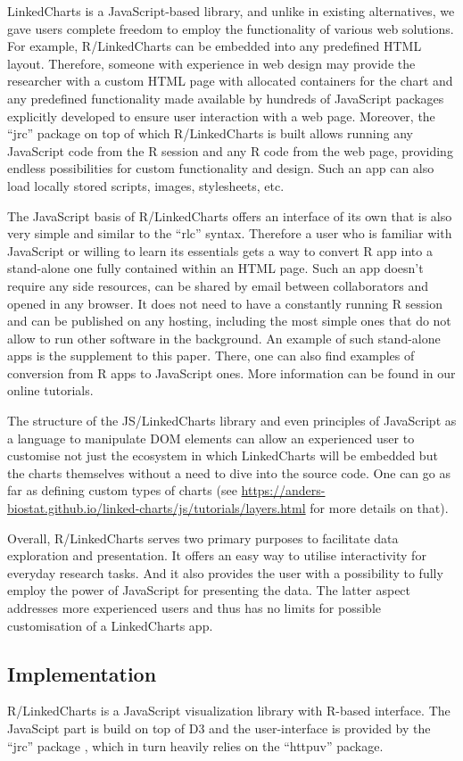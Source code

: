 \documentclass[twocolumn,10pt]{article}
\begin{document}
LinkedCharts is a JavaScript-based library, and unlike in existing alternatives, we gave users complete freedom to employ the functionality of various web solutions. For example, R/LinkedCharts can be embedded into any predefined HTML layout. Therefore, someone with experience in web design may provide the researcher with a custom HTML page with allocated containers for the chart and any predefined functionality made available by hundreds of JavaScript packages explicitly developed to ensure user interaction with a web page. Moreover, the ``jrc'' package on top of which R/LinkedCharts is built allows running any JavaScript code from the R session and any R code from the web page, providing endless possibilities for custom functionality and design. Such an app can also load locally stored scripts, images, stylesheets, etc.

The JavaScript basis of R/LinkedCharts offers an interface of its own that is also very simple and similar to the ``rlc'' syntax. Therefore a user who is familiar with JavaScript or willing to learn its essentials gets a way to convert R app into a stand-alone one fully contained within an HTML page. Such an app doesn't require any side resources, can be shared by email between collaborators and opened in any browser. It does not need to have a constantly running R session and can be published on any hosting, including the most simple ones that do not allow to run other software in the background. An example of such stand-alone apps is the supplement to this paper. There, one can also find examples of conversion from R apps to JavaScript ones. More information can be found in our online tutorials.

The structure of the JS/LinkedCharts library and even principles of JavaScript as a language to manipulate DOM elements can allow an experienced user to customise not just the ecosystem in which LinkedCharts will be embedded but the charts themselves without a need to dive into the source code. One can go as far as defining custom types of charts (see \url{https://anders-biostat.github.io/linked-charts/js/tutorials/layers.html} for more details on that).

Overall, R/LinkedCharts serves two primary purposes to facilitate data exploration and presentation. It offers an easy way to utilise interactivity for everyday research tasks. And it also provides the user with a possibility to fully employ the power of JavaScript for presenting the data. The latter aspect addresses more experienced users and thus has no limits for possible customisation of a LinkedCharts app.


\subsection{Implementation}

R/LinkedCharts is a JavaScript visualization library with R-based \citep{R_2019} interface. The JavaScipt part is build on top of D3 \citep{bostock_2011} and the user-interface is provided by the ``jrc'' package \citep{jrc_2020}, which in turn heavily relies on the ``httpuv'' \citep{cheng_2020} package.


\begin{small} 
\balance

\end{small}
\end{document}
